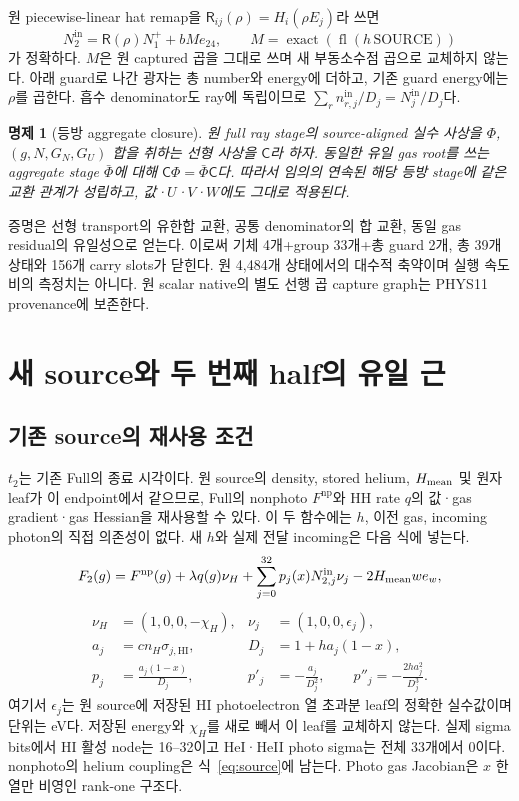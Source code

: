 \documentclass[11pt,a4paper]{article}
\newcommand{\R}{\mathsf R}
\newcommand{\vu}{\nu_H}
\newcommand{\Np}{N^{\mathrm{in}}}
\newtheorem{proposition}{명제}
\begin{document}
원 piecewise-linear hat remap을 $\R_{ij}(\rho)=H_i(\rho E_j)$라 쓰면
\begin{equation}
 \Np_2=\R(\rho)N_1^+ + bM e_{24},\qquad
 M=\operatorname{exact}(\operatorname{fl}(h\,\mathrm{SOURCE}))
\end{equation}
가 정확하다. $M$은 원 captured 곱을 그대로 쓰며 새 부동소수점 곱으로 교체하지 않는다. 아래 guard로 나간 광자는 총 number와 energy에 더하고, 기존 guard energy에는 $\rho$를 곱한다. 흡수 denominator도 ray에 독립이므로 $\sum_r n_{r,j}^{\mathrm{in}}/D_j=N_j^{\mathrm{in}}/D_j$다.

\begin{proposition}[등방 aggregate closure]
원 full ray stage의 source-aligned 실수 사상을 $\Phi$, $(g,N,G_N,G_U)$ 합을 취하는 선형 사상을 $\mathsf C$라 하자. 동일한 유일 gas root를 쓰는 aggregate stage $\bar\Phi$에 대해 $\mathsf C\Phi=\bar\Phi\mathsf C$다. 따라서 임의의 연속된 해당 등방 stage에 같은 교환 관계가 성립하고, 값·$U$·$V$·$W$에도 그대로 적용된다.
\end{proposition}
증명은 선형 transport의 유한합 교환, 공통 denominator의 합 교환, 동일 gas residual의 유일성으로 얻는다. 이로써 기체 4개+group 33개+총 guard 2개, 총 39개 상태와 156개 carry slots가 닫힌다. 원 4,484개 상태에서의 대수적 축약이며 실행 속도비의 측정치는 아니다. 원 scalar native의 별도 선행 곱 capture graph는 PHYS11 provenance에 보존한다.\cite{theory,phys11}

\section{새 source와 두 번째 half의 유일 근}
\subsection{기존 source의 재사용 조건}
$t_2$는 기존 Full의 종료 시각이다. 원 source의 density, stored helium, $H_{\rm mean}$ 및 원자 leaf가 이 endpoint에서 같으므로, Full의 nonphoto $F^{\mathrm{np}}$와 HH rate $q$의 값·gas gradient·gas Hessian을 재사용할 수 있다. 이 두 함수에는 $h$, 이전 gas, incoming photon의 직접 의존성이 없다. 새 $h$와 실제 전달 incoming은 다음 식에 넣는다.\cite{source,theory}
\begin{equation}\label{eq:source}
 F_2(g)=F^{\mathrm{np}}(g)+\lambda q(g)\vu
 +\sum_{j=0}^{32}p_j(x)\Np_{2,j}\nu_j-2H_{\rm mean}w e_w,
\end{equation}
\begin{align}
 \vu&=(1,0,0,-\chi_H),&\nu_j&=(1,0,0,\epsilon_j),\\
 a_j&=c n_H\sigma_{j,\mathrm{HI}},&D_j&=1+h a_j(1-x),\\
 p_j&=\frac{a_j(1-x)}{D_j},&p'_j&=-\frac{a_j}{D_j^2},\qquad p''_j=-\frac{2ha_j^2}{D_j^3}.
\end{align}
여기서 $\epsilon_j$는 원 source에 저장된 HI photoelectron 열 초과분 leaf의 정확한 실수값이며 단위는 eV다. 저장된 energy와 $\chi_H$를 새로 빼서 이 leaf를 교체하지 않는다. 실제 sigma bits에서 HI 활성 node는 16--32이고 HeI·HeII photo sigma는 전체 33개에서 0이다. nonphoto의 helium coupling은 식~\eqref{eq:source}에 남는다. Photo gas Jacobian은 $x$ 한 열만 비영인 rank-one 구조다.\cite{result,theory}
\end{document}
